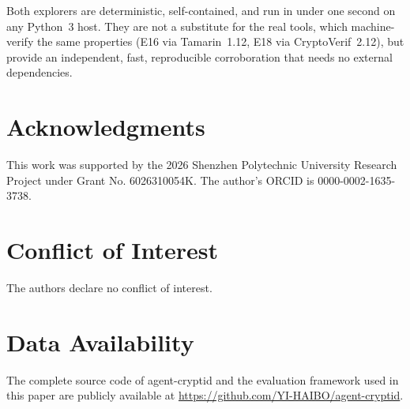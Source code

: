 \documentclass[10pt,twocolumn]{IEEEtran}
\begin{document}
\begin{appendices}
Both explorers are deterministic, self-contained, and run in under
one second on any Python~3 host. They are not a substitute for the
real tools, which machine-verify the same properties (E16 via
Tamarin~1.12, E18 via CryptoVerif~2.12), but provide an independent,
fast, reproducible corroboration that needs no external dependencies.

\section*{Acknowledgments}
This work was supported by the 2026 Shenzhen Polytechnic University
Research Project under Grant No. 6026310054K. The author's ORCID is
0000-0002-1635-3738.

\section*{Conflict of Interest}
The authors declare no conflict of interest.

\section*{Data Availability}
The complete source code of agent-cryptid and the evaluation framework used in
this paper are publicly available at
\url{https://github.com/YI-HAIBO/agent-cryptid}.


\end{appendices}
\end{document}
